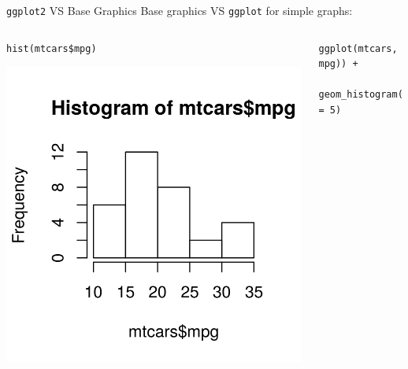 \documentclass[table,smaller]{beamer}
\begin{document}
\begin{frame}[fragile,label=sec-1-8]{\texttt{ggplot2} VS Base Graphics}
 Base graphics VS \texttt{ggplot} for simple graphs:
\begin{columns}
\begin{column}{0.5\textwidth}

\begin{columns}  \begin{block}{}

\begin{verbatim}
hist(mtcars$mpg)
\end{verbatim}

\includegraphics[width=.9\linewidth]{images/baseHist1.png}
\end{block} \end{columns}
\end{column}
\begin{column}{0.5\textwidth}

\begin{columns}  \begin{block}{}

\begin{verbatim}
ggplot(mtcars, aes(x = mpg)) +
  geom_histogram(binwidth = 5)
\end{verbatim}


\end{block}
\end{columns}
\end{column}
\end{columns}
\end{frame}
\end{document}
